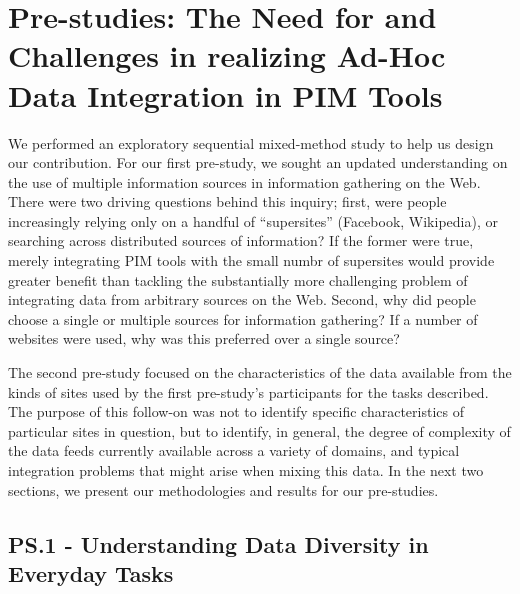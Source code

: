 \documentclass{sigchi}
\begin{document}
\section{Pre-studies: The Need for and Challenges in realizing Ad-Hoc Data Integration in PIM Tools}


We performed an exploratory sequential mixed-method study to help us design our contribution. For our first pre-study, we sought an updated understanding on the use of multiple information sources in information gathering on the Web. There were two driving questions behind this inquiry; first, were people increasingly relying only on a handful of ``supersites'' (Facebook, Wikipedia), or searching across distributed sources of information?  If the former were true, merely integrating PIM tools with the small numbr of supersites would provide greater benefit than tackling the substantially more challenging problem of integrating data from arbitrary sources on the Web.  Second, why did people choose a single or multiple sources for information gathering?  If a number of websites were used, why was this preferred over a single source?


The second pre-study focused on the characteristics of the data available from the kinds of sites used by the first pre-study's participants for the tasks described. The purpose of this follow-on was not to identify specific characteristics of particular sites in question, but to identify, in general, the degree of complexity of the data feeds currently available across a variety of domains, and typical integration problems that might arise when mixing this data.  In the next two sections, we present our methodologies and results for our pre-studies.


\subsection{PS.1 - Understanding Data Diversity in Everyday Tasks}
\end{document}

